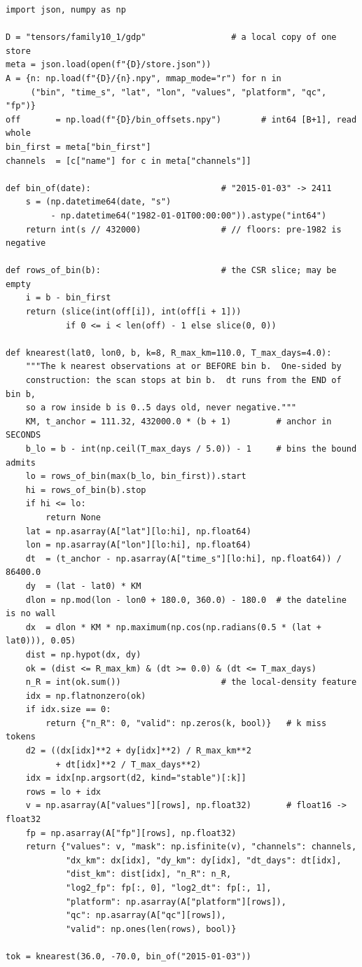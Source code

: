 \documentclass[10pt]{article}
\begin{document}
\begin{verbatim}
import json, numpy as np

D = "tensors/family10_1/gdp"                 # a local copy of one store
meta = json.load(open(f"{D}/store.json"))
A = {n: np.load(f"{D}/{n}.npy", mmap_mode="r") for n in
     ("bin", "time_s", "lat", "lon", "values", "platform", "qc", "fp")}
off       = np.load(f"{D}/bin_offsets.npy")        # int64 [B+1], read whole
bin_first = meta["bin_first"]
channels  = [c["name"] for c in meta["channels"]]

def bin_of(date):                          # "2015-01-03" -> 2411
    s = (np.datetime64(date, "s")
         - np.datetime64("1982-01-01T00:00:00")).astype("int64")
    return int(s // 432000)                # // floors: pre-1982 is negative

def rows_of_bin(b):                        # the CSR slice; may be empty
    i = b - bin_first
    return (slice(int(off[i]), int(off[i + 1]))
            if 0 <= i < len(off) - 1 else slice(0, 0))

def knearest(lat0, lon0, b, k=8, R_max_km=110.0, T_max_days=4.0):
    """The k nearest observations at or BEFORE bin b.  One-sided by
    construction: the scan stops at bin b.  dt runs from the END of bin b,
    so a row inside b is 0..5 days old, never negative."""
    KM, t_anchor = 111.32, 432000.0 * (b + 1)         # anchor in SECONDS
    b_lo = b - int(np.ceil(T_max_days / 5.0)) - 1     # bins the bound admits
    lo = rows_of_bin(max(b_lo, bin_first)).start
    hi = rows_of_bin(b).stop
    if hi <= lo:
        return None
    lat = np.asarray(A["lat"][lo:hi], np.float64)
    lon = np.asarray(A["lon"][lo:hi], np.float64)
    dt  = (t_anchor - np.asarray(A["time_s"][lo:hi], np.float64)) / 86400.0
    dy  = (lat - lat0) * KM
    dlon = np.mod(lon - lon0 + 180.0, 360.0) - 180.0  # the dateline is no wall
    dx  = dlon * KM * np.maximum(np.cos(np.radians(0.5 * (lat + lat0))), 0.05)
    dist = np.hypot(dx, dy)
    ok = (dist <= R_max_km) & (dt >= 0.0) & (dt <= T_max_days)
    n_R = int(ok.sum())                    # the local-density feature
    idx = np.flatnonzero(ok)
    if idx.size == 0:
        return {"n_R": 0, "valid": np.zeros(k, bool)}   # k miss tokens
    d2 = ((dx[idx]**2 + dy[idx]**2) / R_max_km**2
          + dt[idx]**2 / T_max_days**2)
    idx = idx[np.argsort(d2, kind="stable")[:k]]
    rows = lo + idx
    v = np.asarray(A["values"][rows], np.float32)       # float16 -> float32
    fp = np.asarray(A["fp"][rows], np.float32)
    return {"values": v, "mask": np.isfinite(v), "channels": channels,
            "dx_km": dx[idx], "dy_km": dy[idx], "dt_days": dt[idx],
            "dist_km": dist[idx], "n_R": n_R,
            "log2_fp": fp[:, 0], "log2_dt": fp[:, 1],
            "platform": np.asarray(A["platform"][rows]),
            "qc": np.asarray(A["qc"][rows]),
            "valid": np.ones(len(rows), bool)}

tok = knearest(36.0, -70.0, bin_of("2015-01-03"))
\end{verbatim}
\end{document}
